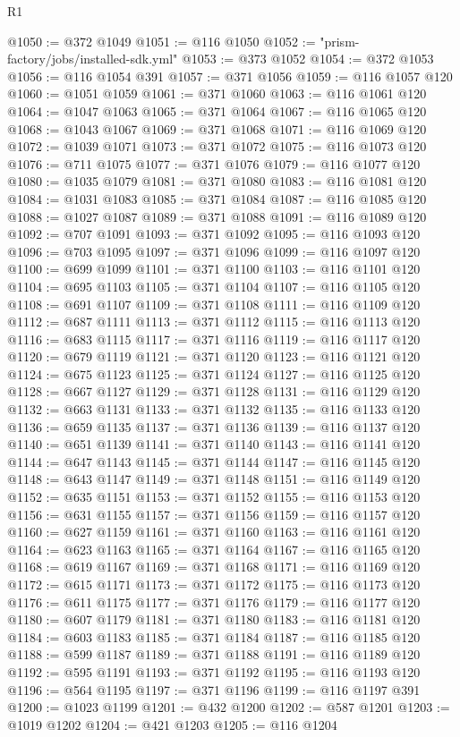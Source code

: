\begin{lexlean}{R1}
\begin{coremodule}
@1050 := @372 @1049
@1051 := @116 @1050
@1052 := "prism-factory/jobs/installed-sdk.yml"
@1053 := @373 @1052
@1054 := @372 @1053
@1056 := @116 @1054 @391
@1057 := @371 @1056
@1059 := @116 @1057 @120
@1060 := @1051 @1059
@1061 := @371 @1060
@1063 := @116 @1061 @120
@1064 := @1047 @1063
@1065 := @371 @1064
@1067 := @116 @1065 @120
@1068 := @1043 @1067
@1069 := @371 @1068
@1071 := @116 @1069 @120
@1072 := @1039 @1071
@1073 := @371 @1072
@1075 := @116 @1073 @120
@1076 := @711 @1075
@1077 := @371 @1076
@1079 := @116 @1077 @120
@1080 := @1035 @1079
@1081 := @371 @1080
@1083 := @116 @1081 @120
@1084 := @1031 @1083
@1085 := @371 @1084
@1087 := @116 @1085 @120
@1088 := @1027 @1087
@1089 := @371 @1088
@1091 := @116 @1089 @120
@1092 := @707 @1091
@1093 := @371 @1092
@1095 := @116 @1093 @120
@1096 := @703 @1095
@1097 := @371 @1096
@1099 := @116 @1097 @120
@1100 := @699 @1099
@1101 := @371 @1100
@1103 := @116 @1101 @120
@1104 := @695 @1103
@1105 := @371 @1104
@1107 := @116 @1105 @120
@1108 := @691 @1107
@1109 := @371 @1108
@1111 := @116 @1109 @120
@1112 := @687 @1111
@1113 := @371 @1112
@1115 := @116 @1113 @120
@1116 := @683 @1115
@1117 := @371 @1116
@1119 := @116 @1117 @120
@1120 := @679 @1119
@1121 := @371 @1120
@1123 := @116 @1121 @120
@1124 := @675 @1123
@1125 := @371 @1124
@1127 := @116 @1125 @120
@1128 := @667 @1127
@1129 := @371 @1128
@1131 := @116 @1129 @120
@1132 := @663 @1131
@1133 := @371 @1132
@1135 := @116 @1133 @120
@1136 := @659 @1135
@1137 := @371 @1136
@1139 := @116 @1137 @120
@1140 := @651 @1139
@1141 := @371 @1140
@1143 := @116 @1141 @120
@1144 := @647 @1143
@1145 := @371 @1144
@1147 := @116 @1145 @120
@1148 := @643 @1147
@1149 := @371 @1148
@1151 := @116 @1149 @120
@1152 := @635 @1151
@1153 := @371 @1152
@1155 := @116 @1153 @120
@1156 := @631 @1155
@1157 := @371 @1156
@1159 := @116 @1157 @120
@1160 := @627 @1159
@1161 := @371 @1160
@1163 := @116 @1161 @120
@1164 := @623 @1163
@1165 := @371 @1164
@1167 := @116 @1165 @120
@1168 := @619 @1167
@1169 := @371 @1168
@1171 := @116 @1169 @120
@1172 := @615 @1171
@1173 := @371 @1172
@1175 := @116 @1173 @120
@1176 := @611 @1175
@1177 := @371 @1176
@1179 := @116 @1177 @120
@1180 := @607 @1179
@1181 := @371 @1180
@1183 := @116 @1181 @120
@1184 := @603 @1183
@1185 := @371 @1184
@1187 := @116 @1185 @120
@1188 := @599 @1187
@1189 := @371 @1188
@1191 := @116 @1189 @120
@1192 := @595 @1191
@1193 := @371 @1192
@1195 := @116 @1193 @120
@1196 := @564 @1195
@1197 := @371 @1196
@1199 := @116 @1197 @391
@1200 := @1023 @1199
@1201 := @432 @1200
@1202 := @587 @1201
@1203 := @1019 @1202
@1204 := @421 @1203
@1205 := @116 @1204

\end{coremodule}
\end{lexlean}
